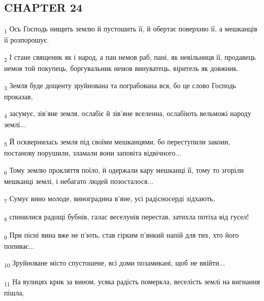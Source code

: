 \subsection{CHAPTER 24}
\begin{tcolorbox}
\textsubscript{1} Ось Господь нищить землю й пустошить її, й обертає поверхню її, а мешканців її розпорошує.
\end{tcolorbox}
\begin{tcolorbox}
\textsubscript{2} І стане священик як і народ, а пан немов раб, пані, як невільниця її, продавець немов той покупець, боргувальник немов винуватець, віритель як довжник.
\end{tcolorbox}
\begin{tcolorbox}
\textsubscript{3} Земля буде дощенту зруйнована та пограбована вся, бо це слово Господь проказав,
\end{tcolorbox}
\begin{tcolorbox}
\textsubscript{4} засумує, зів'яне земля, ослабіє й зів'яне вселенна, ослабіють вельможі народу землі...
\end{tcolorbox}
\begin{tcolorbox}
\textsubscript{5} Й осквернилась земля під своїми мешканцями, бо переступили закони, постанову порушили, зламали вони заповіта відвічного...
\end{tcolorbox}
\begin{tcolorbox}
\textsubscript{6} Тому землю прокляття поїло, й одержали кару мешканці її, тому то згоріли мешканці землі, і небагато людей позосталося...
\end{tcolorbox}
\begin{tcolorbox}
\textsubscript{7} Сумує вино молоде, виноградина в'яне, усі радісносерді зідхають,
\end{tcolorbox}
\begin{tcolorbox}
\textsubscript{8} спинилися радощі бубнів, галас веселунів перестав, затихла потіха від гусел!
\end{tcolorbox}
\begin{tcolorbox}
\textsubscript{9} При пісні вина вже не п'ють, став гірким п'янкий напій для тих, хто його попиває...
\end{tcolorbox}
\begin{tcolorbox}
\textsubscript{10} Зруйноване місто спустошене, всі доми позамикані, щоб не ввійти...
\end{tcolorbox}
\begin{tcolorbox}
\textsubscript{11} На вулицях крик за вином, усяка радість померкла, веселість землі на вигнання пішла,
\end{tcolorbox}
